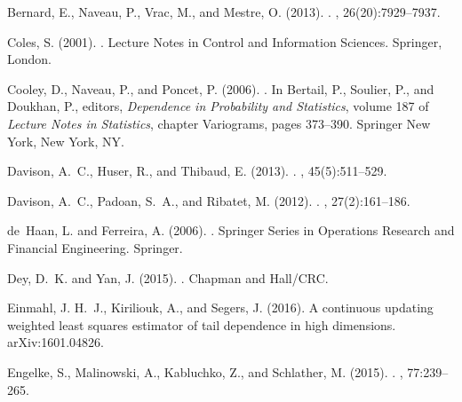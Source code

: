 \documentclass[12pt]{article}
\begin{document}
%
%

\begin{thebibliography}{}

Bernard, E., Naveau, P., Vrac, M., and Mestre, O. (2013).
.
, 26(20):7929--7937.

Coles, S. (2001).
.
\newblock Lecture Notes in Control and Information Sciences. Springer, London.

Cooley, D., Naveau, P., and Poncet, P. (2006).
.
\newblock In Bertail, P., Soulier, P., and Doukhan, P., editors, {\em
  Dependence in Probability and Statistics}, volume 187 of {\em Lecture Notes
  in Statistics}, chapter Variograms, pages 373--390. Springer New York, New
  York, NY.

Davison, A.~C., Huser, R., and Thibaud, E. (2013).
.
, 45(5):511--529.

Davison, A.~C., Padoan, S.~A., and Ribatet, M. (2012).
.
, 27(2):161--186.

de~Haan, L. and Ferreira, A. (2006).
.
\newblock Springer Series in Operations Research and Financial Engineering.
  Springer.

Dey, D.~K. and Yan, J. (2015).
.
\newblock Chapman and Hall/CRC.

Einmahl, J. H.~J., Kiriliouk, A., and Segers, J. (2016).
\newblock A continuous updating weighted least squares estimator of tail
  dependence in high dimensions.
\newblock arXiv:1601.04826.

Engelke, S., Malinowski, A., Kabluchko, Z., and Schlather, M. (2015).
.
, 77:239--265.


\end{thebibliography}
\end{document}
